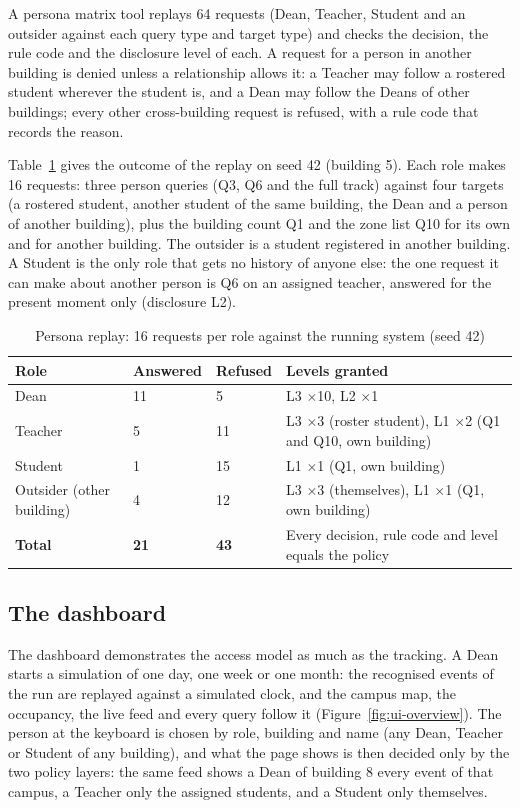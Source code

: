 \documentclass[12pt,a4paper,oneside]{report}
\begin{document}
A persona matrix tool replays 64 requests (Dean, Teacher, Student and an outsider against each query type and target type) and checks the decision, the rule code and the disclosure level of each. A request for a person in another building is denied unless a relationship allows it: a Teacher may follow a rostered student wherever the student is, and a Dean may follow the Deans of other buildings; every other cross-building request is refused, with a rule code that records the reason.

Table~\ref{tab:replay} gives the outcome of the replay on seed 42 (building 5). Each role makes 16 requests: three person queries (Q3, Q6 and the full track) against four targets (a rostered student, another student of the same building, the Dean and a person of another building), plus the building count Q1 and the zone list Q10 for its own and for another building. The outsider is a student registered in another building. A Student is the only role that gets no history of anyone else: the one request it can make about another person is Q6 on an assigned teacher, answered for the present moment only (disclosure L2).

\begin{table}[htbp]
\centering
\caption{Persona replay: 16 requests per role against the running system (seed 42)}\label{tab:replay}
{\small\setlength{\tabcolsep}{4pt}\renewcommand{\arraystretch}{1.2}
\begin{tabular}{|p{4.2cm}|p{1.9cm}|p{1.9cm}|p{5.6cm}|}\hline
\textbf{Role} & \textbf{Answered} & \textbf{Refused} & \textbf{Levels granted}\\\hline
Dean & 11 & 5 & L3 $\times$10, L2 $\times$1\\\hline
Teacher & 5 & 11 & L3 $\times$3 (roster student), L1 $\times$2 (Q1 and Q10, own building)\\\hline
Student & 1 & 15 & L1 $\times$1 (Q1, own building)\\\hline
Outsider (other building) & 4 & 12 & L3 $\times$3 (themselves), L1 $\times$1 (Q1, own building)\\\hline
\textbf{Total} & \textbf{21} & \textbf{43} & Every decision, rule code and level equals the policy\\\hline
\end{tabular}}
\end{table}

\subsection{The dashboard}\label{sec:res-ui}
The dashboard demonstrates the access model as much as the tracking. A Dean starts a simulation of one day, one week or one month: the recognised events of the run are replayed against a simulated clock, and the campus map, the occupancy, the live feed and every query follow it (Figure~\ref{fig:ui-overview}). The person at the keyboard is chosen by role, building and name (any Dean, Teacher or Student of any building), and what the page shows is then decided only by the two policy layers: the same feed shows a Dean of building 8 every event of that campus, a Teacher only the assigned students, and a Student only themselves.
\end{document}
